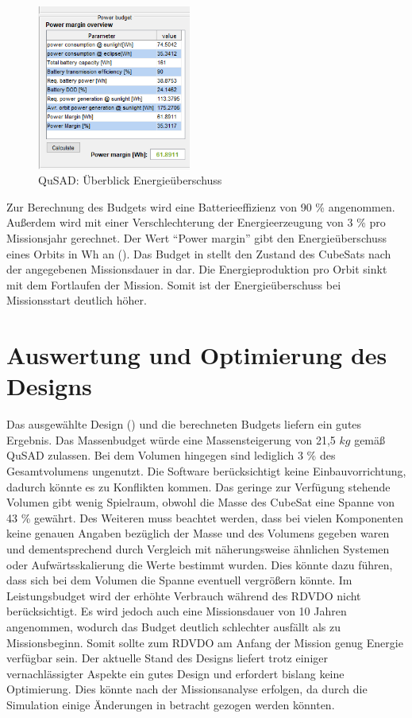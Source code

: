			\begin{figure}[!h]
				\centering
					\includegraphics[width=0.45\textwidth]{graphics/power6.png}
				\caption{QuSAD: Überblick Energieüberschuss}
				\label{fig:power6}
			\end{figure}
Zur Berechnung des Budgets wird eine Batterieeffizienz von 90 \% angenommen. Außerdem wird mit einer Verschlechterung der Energieerzeugung von 3 \% pro Missionsjahr gerechnet. Der Wert “Power margin” gibt den Energieüberschuss eines Orbits in Wh an (). Das Budget in  stellt den Zustand des CubeSats nach der angegebenen Missionsdauer in  dar. Die Energieproduktion pro Orbit sinkt mit dem Fortlaufen der  Mission. Somit ist der Energieüberschuss bei Missionsstart deutlich höher. 			
			
			
			\section{Auswertung und Optimierung des Designs}
			Das ausgewählte Design () und die berechneten Budgets liefern ein gutes Ergebnis. Das Massenbudget würde eine Massensteigerung von 21,5 $kg$ gemäß QuSAD zulassen. Bei dem Volumen hingegen sind lediglich 3 \% des Gesamtvolumens ungenutzt. Die Software berücksichtigt keine Einbauvorrichtung, dadurch könnte es zu Konflikten kommen. Das geringe zur Verfügung stehende Volumen gibt wenig Spielraum, obwohl die Masse des CubeSat eine Spanne von 43 \% gewährt. Des Weiteren muss beachtet werden, dass bei vielen Komponenten keine genauen Angaben bezüglich der Masse und des Volumens gegeben waren und dementsprechend durch Vergleich mit näherungsweise ähnlichen Systemen oder Aufwärtsskalierung die Werte bestimmt wurden. Dies könnte dazu führen, dass sich bei dem Volumen die Spanne eventuell vergrößern könnte. Im Leistungsbudget wird der erhöhte Verbrauch während des RDVDO nicht berücksichtigt. Es wird jedoch auch eine Missionsdauer von 10 Jahren angenommen, wodurch das Budget deutlich schlechter ausfällt als zu Missionsbeginn. Somit sollte zum RDVDO am Anfang der Mission genug Energie verfügbar sein. Der aktuelle Stand des Designs liefert trotz einiger vernachlässigter Aspekte ein gutes Design und erfordert bislang keine Optimierung. Dies könnte nach der Missionsanalyse erfolgen, da durch die Simulation   einige Änderungen in betracht gezogen werden könnten.
